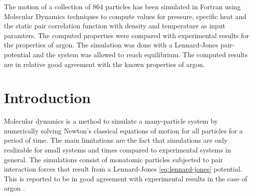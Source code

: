 \documentclass[
10pt, %
a4paper, %
oneside, %
headinclude,footinclude, %
BCOR5mm, %
]{scrartcl}
\begin{document}
The motion of a collection of 864 particles has been simulated in Fortran using Molecular Dynamics techniques to compute values for pressure, specific heat and the static pair correlation function with density and temperature as input paramters. The computed properties were compared with experimental results for the properties of argon. The simulation was done with a Lennard-Jones pair-potential and the system was allowed to reach equilibrium. The computed results are in relative good agreement with the known properties of argon.







\newpage

\section{Introduction}


Molecular dynamics is a method to simulate a many-particle system by numerically solving Newton's classical equations of motion for all particles for a period of time. The main limitations are the fact that simulations are only  realizable for small systems  and times compared to experimental systems in general. %
The simulations consist of monatomic particles subjected to pair interaction forces that result from a Lennard-Jones \ref{eq:lennard-jones} potential.  
This is reported to be in good agreement with experimental results in the case of argon \cite{Verlet:1967md}.
 
\end{document}
